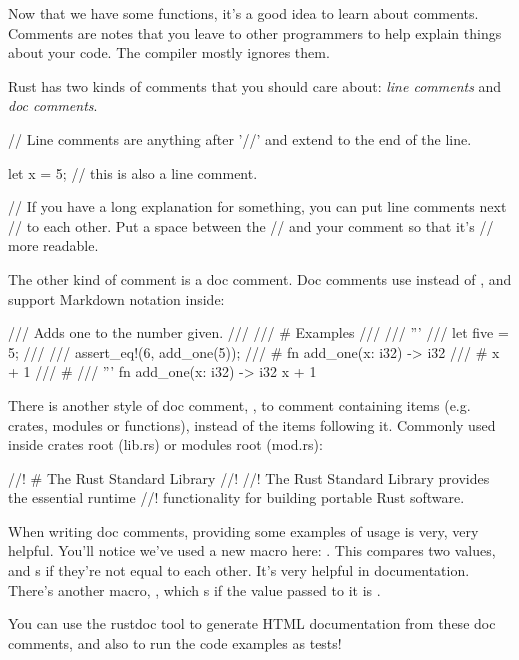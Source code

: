 Now that we have some functions, it's a good idea to learn about comments. Comments are notes that you leave to other programmers to 
help explain things about your code. The compiler mostly ignores them.

\blank

Rust has two kinds of comments that you should care about: \emph{line comments} and \emph{doc comments}.

\begin{rustc}
// Line comments are anything after '//' and extend to the end of the line.

let x = 5; // this is also a line comment.

// If you have a long explanation for something, you can put line comments next
// to each other. Put a space between the // and your comment so that it's
// more readable.
\end{rustc}

The other kind of comment is a doc comment. Doc comments use \code{///} instead of \code{//}, and support Markdown notation inside:

\begin{rustc}
/// Adds one to the number given.
///
/// # Examples
///
/// '''
/// let five = 5;
///
/// assert_eq!(6, add_one(5));
/// # fn add_one(x: i32) -> i32 {
/// #     x + 1
/// # }
/// '''
fn add_one(x: i32) -> i32 {
    x + 1
}
\end{rustc}

There is another style of doc comment, \code{//!}, to comment containing items (e.g. crates, modules or functions), instead of the 
items following it. Commonly used inside crates root (lib.rs) or modules root (mod.rs):

\begin{rustc}
//! # The Rust Standard Library
//!
//! The Rust Standard Library provides the essential runtime
//! functionality for building portable Rust software.
\end{rustc}

When writing doc comments, providing some examples of usage is very, very helpful. You'll notice we've used a new macro here: 
. This compares two values, and \panic s if they're not equal to each other. It's very helpful in documentation.
There's another macro, , which \panic s if the value passed to it is .

\blank

You can use the rustdoc tool to generate HTML documentation from these doc comments, and also to run the code examples as tests!
